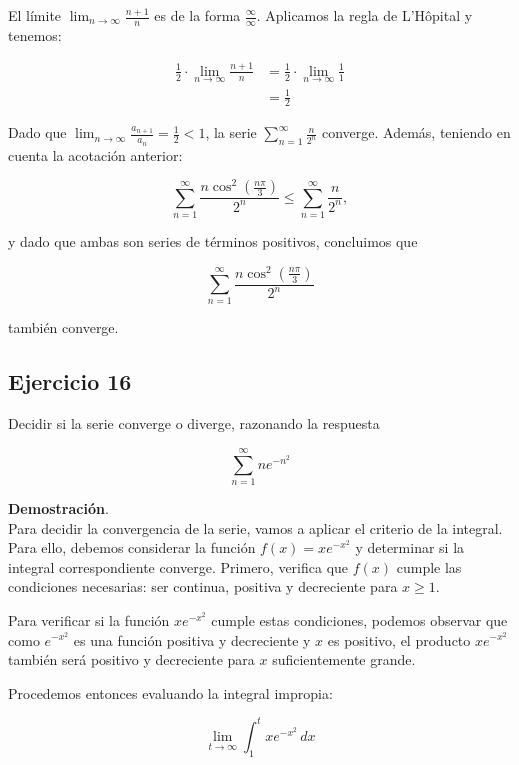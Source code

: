 \documentclass{article}
\begin{document}
    El límite $\lim _{n \rightarrow \infty} \frac{n+1}{n}$ es de la forma $\frac{\infty}{\infty}$. Aplicamos la regla de L'Hôpital y tenemos:

    \begin{align*}
    \frac{1}{2} \cdot \lim _{n \rightarrow \infty} \frac{n+1}{n} &= \frac{1}{2} \cdot \lim _{n \rightarrow \infty} \frac{1}{1} \\
    &= \frac{1}{2}
    \end{align*}

    Dado que $\lim _{n \rightarrow \infty} \frac{a_{n+1}}{a_{n}} = \frac{1}{2} < 1$, la serie $\sum_{n=1}^{\infty} \frac{n}{2^{n}}$ converge. Además, teniendo en cuenta la acotación anterior:

    $$
    \sum_{n=1}^{\infty} \frac{n \cos ^{2}\left(\frac{n \pi}{3}\right)}{2^{n}} \leq \sum_{n=1}^{\infty} \frac{n}{2^{n}},
    $$

    y dado que ambas son series de términos positivos, concluimos que

    $$
    \sum_{n=1}^{\infty} \frac{n \cos ^{2}\left(\frac{n \pi}{3}\right)}{2^{n}}
    $$

    también converge.

    \subsection*{Ejercicio 16}

    Decidir si la serie converge o diverge, razonando la respuesta

    $$
    \sum_{n=1}^{\infty} n e^{-n^{2}}
    $$

    \textbf{Demostración}.\\

    Para decidir la convergencia de la serie, vamos a aplicar el criterio de la integral. Para ello, debemos considerar la función $f(x) = x e^{-x^{2}}$ y determinar si la integral correspondiente converge. Primero, verifica que $f(x)$ cumple las condiciones necesarias: ser continua, positiva y decreciente para $x \geq 1$.

    Para verificar si la función $x e^{-x^{2}}$ cumple estas condiciones, podemos observar que como $e^{-x^{2}}$ es una función positiva y decreciente y $x$ es positivo, el producto $x e^{-x^{2}}$ también será positivo y decreciente para $x$ suficientemente grande.

    Procedemos entonces evaluando la integral impropia:

    $$
    \lim _{t \rightarrow \infty} \int_{1}^{t} x e^{-x^{2}} \, dx
    $$
\end{document}
